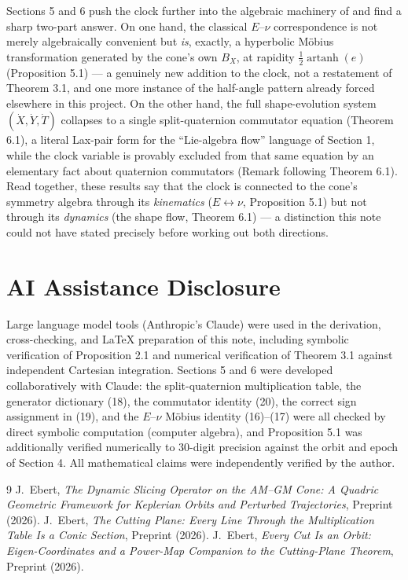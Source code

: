 \documentclass[12pt]{amsart}
\theoremstyle{plain}
\theoremstyle{remark}
\begin{document}
Sections 5 and 6 push the clock further into the algebraic machinery of \cite{Ebert2026Table,Ebert2026EigenCoord} and find a sharp two-part answer. On one hand, the classical $E$--$\nu$ correspondence is not merely algebraically convenient but \emph{is}, exactly, a hyperbolic Möbius transformation generated by the cone's own $B_X$, at rapidity $\tfrac12\operatorname{artanh}(e)$ (Proposition 5.1) --- a genuinely new addition to the clock, not a restatement of Theorem 3.1, and one more instance of the half-angle pattern already forced elsewhere in this project. On the other hand, the full shape-evolution system $(\dot X,\dot Y,\dot T)$ collapses to a single split-quaternion commutator equation (Theorem 6.1), a literal Lax-pair form for the ``Lie-algebra flow'' language of Section 1, while the clock variable is provably excluded from that same equation by an elementary fact about quaternion commutators (Remark following Theorem 6.1). Read together, these results say that the clock is connected to the cone's symmetry algebra through its \emph{kinematics} ($E\leftrightarrow\nu$, Proposition 5.1) but not through its \emph{dynamics} (the shape flow, Theorem 6.1) --- a distinction this note could not have stated precisely before working out both directions.

\section*{AI Assistance Disclosure}

Large language model tools (Anthropic's Claude) were used in the derivation, cross-checking, and LaTeX preparation of this note, including symbolic verification of Proposition 2.1 and numerical verification of Theorem 3.1 against independent Cartesian integration. Sections 5 and 6 were developed collaboratively with Claude: the split-quaternion multiplication table, the generator dictionary (18), the commutator identity (20), the correct sign assignment in (19), and the $E$--$\nu$ Möbius identity (16)--(17) were all checked by direct symbolic computation (computer algebra), and Proposition 5.1 was additionally verified numerically to $30$-digit precision against the orbit and epoch of Section 4. All mathematical claims were independently verified by the author.

\begin{thebibliography}{9}
 J.~Ebert, \emph{The Dynamic Slicing Operator on the AM--GM Cone: A Quadric Geometric Framework for Keplerian Orbits and Perturbed Trajectories}, Preprint (2026).
 J.~Ebert, \emph{The Cutting Plane: Every Line Through the Multiplication Table Is a Conic Section}, Preprint (2026).
 J.~Ebert, \emph{Every Cut Is an Orbit: Eigen-Coordinates and a Power-Map Companion to the Cutting-Plane Theorem}, Preprint (2026).
\end{thebibliography}
\end{document}
